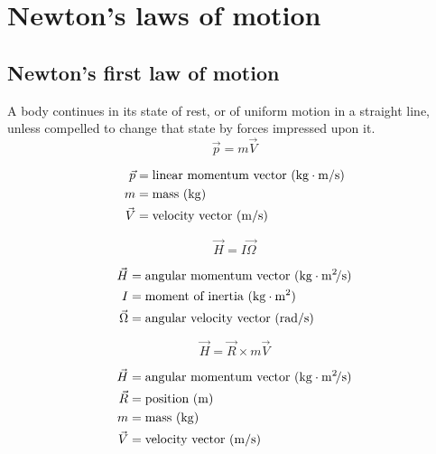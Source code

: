 \documentclass{article}
\begin{document}
\section{Newton's laws of motion}
\subsection{Newton's first law of motion}
\begin{multicols}{2}
A body continues in its state of rest, or of uniform motion in a straight line, unless compelled to change that state by forces impressed upon it.
\vfill\null
\columnbreak
\begin{equation*}
	\boxed{\vec{p} = m\vec{V}}
\end{equation*}

\begin{align*}
\vec{p} &= \text{linear momentum vector (\si{\kilo\gram\meter\per\second})}\\
m &= \text{mass (\si{\kilo\gram})}\\
\vec{V} &= \text{velocity vector (\si{\meter\per\second})}\\
\end{align*}

\end{multicols}

\begin{multicols}{2}
\begin{equation*}
\boxed{\vec{H} = I\vec{\Omega}}
\end{equation*}

\begin{align*}
\vec{H} &= \text{angular momentum vector (\si{\kilo\gram\meter\squared\per\second})}\\
I &= \text{moment of inertia (\si{\kilo\gram\meter\squared})}\\
\vec{\Omega} &= \text{angular velocity vector (\si{\radian\per\second})}\\
\end{align*}

\vfill\null
\columnbreak

\begin{equation*}
\boxed{\vec{H} = \vec{R} \times m\vec{V}}
\end{equation*}

\begin{align*}
\vec{H} &= \text{angular momentum vector (\si{\kilo\gram\meter\squared\per\second})}\\
\vec{R} &= \text{position (\si{\meter})}\\
m &= \text{mass (\si{\kilo\gram})}\\
\vec{V} &= \text{velocity vector (\si{\meter\per\second})}\\
\end{align*}
\vfill\null
\end{multicols}
\end{document}
